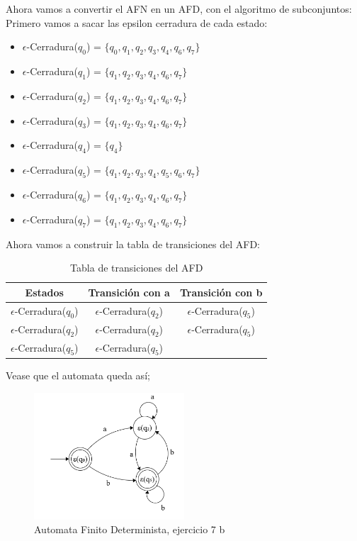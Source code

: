 \begin{enumerate}
    Ahora vamos a convertir el AFN en un AFD, con el algoritmo de subconjuntos:
    Primero vamos a sacar las epsilon cerradura de cada estado:
    \begin{itemize}
        \item $\epsilon$-Cerradura($q_0$) = $\{q_0, q_1, q_2, q_3, q_4, q_6, q_7\}$
        \item $\epsilon$-Cerradura($q_1$) = $\{q_1, q_2, q_3, q_4, q_6, q_7\}$
        \item $\epsilon$-Cerradura($q_2$) = $\{q_1, q_2, q_3, q_4, q_6, q_7\}$
        \item $\epsilon$-Cerradura($q_3$) = $\{q_1, q_2, q_3, q_4, q_6, q_7\}$
        \item $\epsilon$-Cerradura($q_4$) = $\{q_4\}$
        \item $\epsilon$-Cerradura($q_5$) = $\{q_1, q_2, q_3, q_4, q_5, q_6, q_7\}$
        \item $\epsilon$-Cerradura($q_6$) = $\{q_1, q_2, q_3, q_4, q_6, q_7\}$
        \item $\epsilon$-Cerradura($q_7$) = $\{q_1, q_2, q_3, q_4, q_6, q_7\}$
    \end{itemize}
    Ahora vamos a construir la tabla de transiciones del AFD:
    \begin{table}[ht]        
    \centering
    \begin{tabular}{|c|c|c|}
    \hline
    \textbf{Estados} & \textbf{Transición con a} & \textbf{Transición con b } \\
    \hline
    $\epsilon$-Cerradura($q_0$) &$\epsilon$-Cerradura($q_2$) & $\epsilon$-Cerradura($q_5$) \\
    \hline      
    $\epsilon$-Cerradura($q_2$) & $\epsilon$-Cerradura($q_2$) & $\epsilon$-Cerradura($q_5$) \\
    \hline 
    $\epsilon$-Cerradura($q_5$) & $\epsilon$-Cerradura($q_5$) \\
    \hline
    \end{tabular}
    \caption{Tabla de transiciones del AFD} 
    \end{table}

    Vease que el automata queda así;

    \begin{figure}[ht]
        \centering
        \includegraphics[width=0.5\textwidth]{images/7bDFA.png}
        \caption{Automata Finito Determinista, ejercicio 7 b}
    \end{figure}


\end{enumerate}
